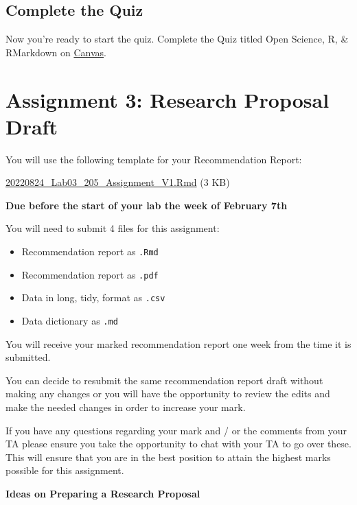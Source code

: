 \documentclass[
]{book}
\providecommand{\tightlist}{%
  \setlength{\itemsep}{0pt}\setlength{\parskip}{0pt}}
\begin{document}
\hypertarget{complete-the-quiz}{%
\section*{Complete the Quiz}\label{complete-the-quiz}}

Now you're ready to start the quiz. Complete the Quiz titled Open Science, R, \& RMarkdown on \href{https://canvas.ubc.ca/courses/98621}{Canvas}.

\hypertarget{assignment-3-research-proposal-draft}{%
\chapter*{Assignment 3: Research Proposal Draft}\label{assignment-3-research-proposal-draft}}

You will use the following template for your Recommendation Report:

\href{}{20220824\_Lab03\_205\_Assignment\_V1.Rmd} (3 KB)

\textbf{Due before the start of your lab the week of February 7th}

You will need to submit 4 files for this assignment:

\begin{itemize}
\tightlist
\item
  Recommendation report as \texttt{.Rmd}
\item
  Recommendation report as \texttt{.pdf}
\item
  Data in long, tidy, format as \texttt{.csv}
\item
  Data dictionary as \texttt{.md}
\end{itemize}

You will receive your marked recommendation report one week from the time it is submitted.

You can decide to resubmit the same recommendation report draft without making any changes or you will have the opportunity to review the edits and make the needed changes in order to increase your mark.

If you have any questions regarding your mark and / or the comments from your TA please ensure you take the opportunity to chat with your TA to go over these. This will ensure that you are in the best position to attain the highest marks possible for this assignment.

\textbf{Ideas on Preparing a Research Proposal}
\end{document}
